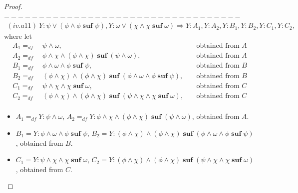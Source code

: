 \documentclass[manuscript,screen]{acmart}
\newcommand{\dddef}[0]{=_{df}}
\DeclareMathOperator{\osuf}{\mathbf{suf}}
\begin{document}
\begin{proof}
\ifx
$----------------------------------$
$$
\begin{aligned}
(iv.a11)\ Y : \psi \vee (\phi\wedge \phi\osuf \psi), Y : \omega\vee (\chi\wedge \chi\osuf \omega)\Rightarrow 
Y : A_1, Y : A_2, Y : B_1, Y : B_2, Y : C_1, Y : C_2,
\end{aligned}
$$
where let 
$$
\begin{aligned}
A_1 \dddef&\ \psi\wedge \omega, &&\ \mbox{obtained from $A$}\\
A_2 \dddef&\ \phi\wedge \chi\wedge (\phi\wedge \chi)\osuf (\psi\wedge \omega), &&\ \mbox{obtained from $A$}\\
B_1 \dddef&\ \phi\wedge \omega\wedge \phi\osuf \psi, &&\ \mbox{obtained from $B$}\\
B_2 \dddef&\ (\phi\wedge \chi)\wedge (\phi\wedge \chi)\osuf(\phi\wedge \omega\wedge \phi\osuf \psi), &&\ \mbox{obtained from $B$}\\
C_1 \dddef&\ \psi\wedge \chi\wedge \chi\osuf\omega, &&\ \mbox{obtained from $C$}\\
C_2 \dddef&\ (\phi\wedge \chi)\wedge (\phi\wedge \chi)\osuf (\psi\wedge \chi\wedge \chi\osuf\omega), &&\ \mbox{obtained from $C$}\\
\end{aligned}
$$

\ifx
\begin{itemize}
\item $A_1 \dddef Y : \psi\wedge \omega$, $A_2 \dddef Y : \phi\wedge \chi\wedge (\phi\wedge \chi)\osuf (\psi\wedge \omega)$, obtained from $A$.
\item $B_1 = Y : \phi\wedge \omega\wedge \phi\osuf \psi$, $B_2 = Y : (\phi\wedge \chi)\wedge (\phi\wedge \chi)\osuf(\phi\wedge \omega\wedge \phi\osuf \psi)$, obtained from $B$.
\item $C_1=Y : \psi\wedge \chi\wedge \chi\osuf\omega$, $C_2 = Y : (\phi\wedge \chi)\wedge (\phi\wedge \chi)\osuf (\psi\wedge \chi\wedge \chi\osuf\omega)$, obtained from $C$.
\end{itemize}
\fi


\end{proof}
\end{document}
